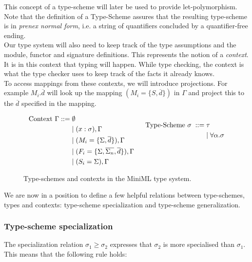 \documentclass[10pt,a4paper,draft]{article}
\begin{document}
\begin{flushleft}
This concept of a type-scheme will later be used to provide let-polymorphism.  Note that the definition of a Type-Scheme assures that the resulting type-scheme is in \emph{prenex normal form}, i.e. a string of quantifiers concluded by a quantifier-free ending.
\\[2ex]
Our type system will also need to keep track of the type assumptions and the module, functor and signature definitions. This represents the notion of a \emph{context}. It is in this context that typing will happen. While type checking, the context is what the type checker uses to keep track of the facts it already knows.
\\[2ex]
To access mappings from these contexts, we will introduce projections. For example $M_{i}.\overline{d}$ will look up the mapping $(M_{i} = \lbrace S,\overline{d}\rbrace)$ in $\Gamma$ and project this to the $\overline{d}$ specified in the mapping.

\begin{figure}[!htbp]
\begin{align*}
\begin{aligned}
\text{Context }\Gamma ::=\; &\emptyset \\
&| \; (x:\sigma),\Gamma \\
&| \; (M_{i}=\lbrace \Sigma,\overline{d}\rbrace), \Gamma \\
&| \; (F_{i}=\lbrace \Sigma, \overline{\Sigma_{n}}, \overline{d} \rbrace), \Gamma \\
&| \; (S_{i}= \Sigma), \Gamma
\end{aligned}
\begin{aligned}
\;\;\;\;\;\;
\end{aligned}
\begin{aligned}
\text{Type-Scheme } \sigma \; ::= \; &\tau \\
&| \; \forall \alpha . \sigma \\
\\
\\
\end{aligned}
\end{align*}
\caption{Type-schemes and contexts in the MiniML type system.}
\label{fig:Type-schemesAndContexts}
\end{figure}

We are now in a position to define a few helpful relations between type-schemes, types and contexts: type-scheme specialization and type-scheme generalization.

\subsubsection{Type-scheme specialization}
The specialization relation $\sigma_{1} \geq \sigma_{2}$ expresses that $\sigma_{2}$ is more specialised than $\sigma_{1}$. This means that the following rule holds:
%


\end{flushleft}
\end{document}
